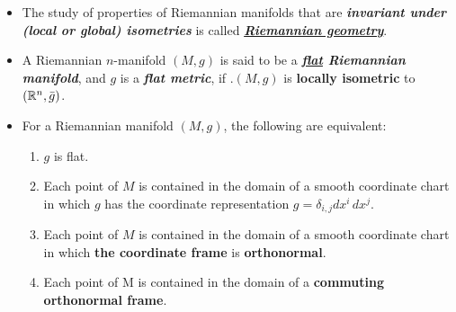 \documentclass[11pt]{article}
\begin{document}
\begin{itemize}
\item \begin{definition}
The study of properties of Riemannian manifolds that are \emph{\textbf{invariant under (local or global) isometries}} is called \underline{\emph{\textbf{Riemannian geometry}}}.
\end{definition}

\item \begin{definition}
A Riemannian $n$-manifold $(M, g)$ is said to be a \emph{\textbf{\underline{flat} Riemannian manifold}}, and $g$ is a \emph{\textbf{flat metric}}, if .$(M, g)$ is \textbf{locally isometric} to $({\mathbb R}^n, \bar{g})$.
\end{definition}

\item \begin{theorem}
For a Riemannian manifold $(M, g)$, the following are equivalent:
\begin{enumerate}
\item $g$ is flat.
\item Each point of $M$ is contained in the domain of a smooth coordinate chart in which $g$ has the coordinate representation $g = \delta_{i,j}dx^i\,dx^j$.
\item Each point of $M$ is contained in the domain of a smooth coordinate chart in which \textbf{the coordinate frame} is \textbf{orthonormal}.
\item Each point of M is contained in the domain of a \textbf{commuting orthonormal frame}.
\end{enumerate}
\end{theorem}
\end{itemize}
\end{document}
